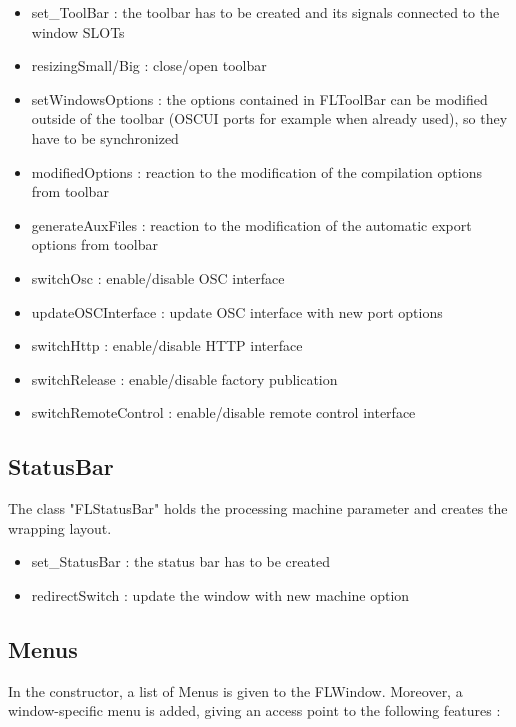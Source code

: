 \documentclass[a4paper]{article}
\begin{document}
\begin{itemize}
\item set\_ToolBar : the toolbar has to be created and its signals connected to the window SLOTs
\item resizingSmall/Big : close/open toolbar
\item setWindowsOptions : the options contained in FLToolBar can be modified outside of the toolbar (OSCUI ports for example when already used), so they have to be synchronized
\item modifiedOptions : reaction to the modification of the compilation options from toolbar
\item generateAuxFiles : reaction to the modification of the automatic export options from toolbar
\item switchOsc : enable/disable OSC interface
\item updateOSCInterface : update OSC interface with new port options
\item switchHttp : enable/disable HTTP interface
\item switchRelease : enable/disable factory publication
\item switchRemoteControl : enable/disable remote control interface
\end{itemize}

\subsection{StatusBar}

The class "FLStatusBar" holds the processing machine parameter and creates the wrapping layout. 

\begin{itemize}
\item set\_StatusBar : the status bar has to be created
\item redirectSwitch : update the window with new machine option
\end{itemize}

\subsection{Menus}

In the constructor, a list of Menus is given to the FLWindow. Moreover, a window-specific menu is added, giving an access point to the following features :
\end{document}
